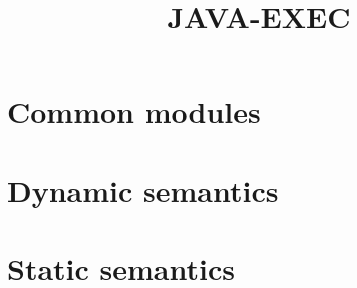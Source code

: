 \documentclass{report}
\title{JAVA-EXEC}
\begin{document}
\chapter{Common modules}










\chapter{Dynamic semantics}

















\chapter{Static semantics}






















\end{document}

